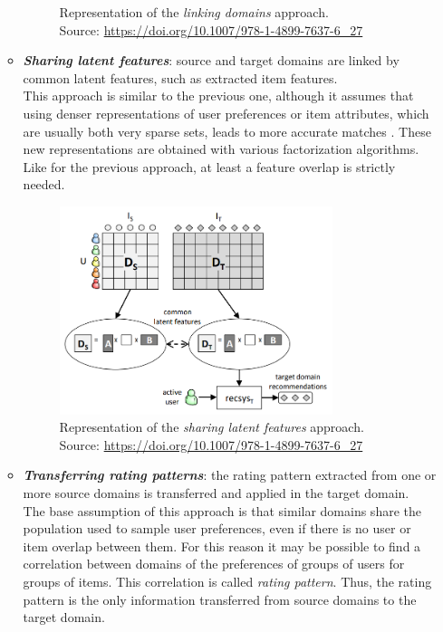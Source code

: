\begin{itemize}
\begin{itemize}
\begin{figure}[hbt]
\caption{Representation of the \textit{linking domains} approach.\\
Source: \url{https://doi.org/10.1007/978-1-4899-7637-6\_27}}
\end{figure}
\item \textbf{\textit{Sharing latent features}}: source and target domains are linked by common latent features, such as extracted item features.\\
This approach is similar to the previous one, although it assumes that using denser representations of user preferences or item attributes, which are usually both very sparse sets, leads to more accurate matches \cite{10.5555/2283696.2283784, 10.5555/2898607.2898644}. These new representations are obtained with various factorization algorithms. Like for the previous approach, at least a feature overlap is strictly needed.
\begin{figure}[hbt]
\centering
\includegraphics[width=0.8\textwidth]{pictures/sharing-latent-features}
\caption{Representation of the \textit{sharing latent features} approach.\\
Source: \url{https://doi.org/10.1007/978-1-4899-7637-6\_27}}
\end{figure}
\item \textbf{\textit{Transferring rating patterns}}: the rating pattern extracted from one or more source domains is transferred and applied in the target domain.\\
The base assumption of this approach is that similar domains share the population used to sample user preferences, even if there is no user or item overlap between them. For this reason it may be possible to find a correlation between domains of the preferences of groups of users for groups of items. This correlation is called \textit{rating pattern}. Thus, the rating pattern is the only information transferred from source domains to the target domain.\\

\end{itemize}
\end{itemize}
